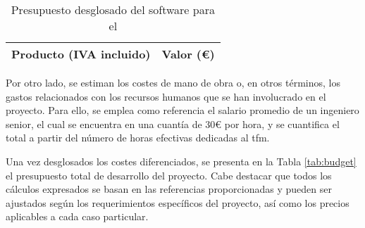 \vspace{3mm}

\begin{table}[ht]
	\centering
	\begin{tabular}{|c|r|}
		\hline
		\rowcolor[HTML]{EFEFEF}
		\textbf{Producto (IVA incluido)} & \multicolumn{1}{c|}{\cellcolor[HTML]{EFEFEF}\textbf{Valor (€)}} \\ \hline
	\end{tabular}
	\caption{Presupuesto desglosado del software para el }
	\label{tab:costesSoftware}
\end{table}

\vspace{3mm}

Por otro lado, se estiman los costes de mano de obra o, en otros términos, los gastos relacionados con los recursos humanos que se han involucrado en el proyecto. Para ello, se emplea como referencia el salario promedio de un ingeniero senior, el cual se encuentra en una cuantía de 30€ por hora, y se cuantifica el total a partir del número de horas efectivas dedicadas al \gls{tfm}. 

\vspace{3mm}

Una vez desglosados los costes diferenciados, se presenta en la Tabla \ref{tab:budget} el presupuesto total de desarrollo del proyecto. Cabe destacar que todos los cálculos expresados se basan en las referencias proporcionadas y pueden ser ajustados según los requerimientos específicos del proyecto, así como los precios aplicables a cada caso particular.

\vspace{3mm}


